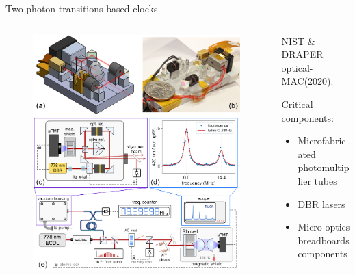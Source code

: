 \begin{frame}{Two-photon transitions based clocks}

    \begin{columns}[c, onlytextwidth]

        \begin{column}{0.5\textwidth}

            \begin{figure}
                \centering
                \includegraphics[width=\textwidth]{img/NIST-DRAPER-optical.jpeg}
            \end{figure}

        \end{column}

        \hfill

        \begin{column}{0.45\textwidth}

            NIST \& DRAPER optical-MAC\footnotemark[1] (2020).

            \vspace{10pt}

            Critical components:

            \begin{itemize}
                \item Microfabricated photomultiplier tubes
                \item DBR lasers
                \item Micro optics breadboards components
            \end{itemize}


\end{column}
\end{columns}
\end{frame}
